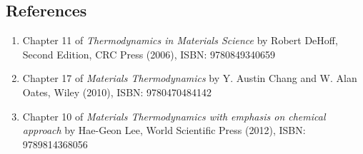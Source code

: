 \subsection{References}
\begin{enumerate}
\item Chapter 11 of {\em Thermodynamics in Materials Science} by Robert DeHoff, Second Edition, CRC Press (2006), ISBN: 9780849340659
\item Chapter 17 of {\em Materials Thermodynamics} by Y. Austin Chang and W. Alan Oates, Wiley (2010), ISBN: 9780470484142
\item Chapter 10 of {\em Materials Thermodynamics with emphasis on chemical approach} by Hae-Geon Lee, World Scientific Press (2012), ISBN:  9789814368056
\end{enumerate}

